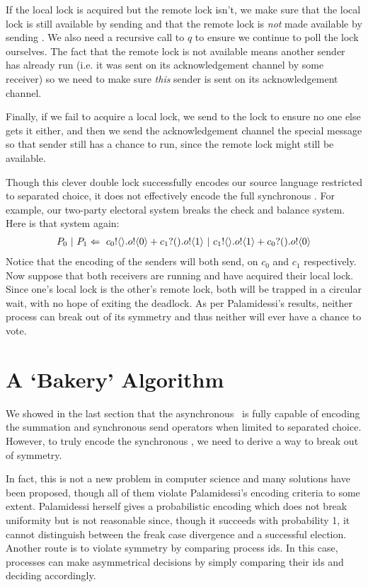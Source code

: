 If the local lock is acquired but the remote lock isn't, we make sure that the local lock is still available by sending  and that the remote lock is \emph{not} made available by sending .  
We also need a recursive call to $q$ to ensure we continue to poll the lock ourselves.  
The fact that the remote lock is not available means another sender has already run (i.e. it was sent \ptrue on its acknowledgement channel by some receiver) so we need to make sure \emph{this} sender is sent \pfalse on its acknowledgement channel.

Finally, if we fail to acquire a local lock, we send \pfalse to the lock to ensure no one else gets it either, and then we send the acknowledgement channel the special message \pretry so that sender still has a chance to run, since the remote lock might still be available.

Though this clever double lock successfully encodes our source language restricted to separated choice, it does not effectively encode the full synchronous \picalc.  
For example, our two-party electoral system breaks the check and balance system.  Here is that system again:
\begin{align}
	P_0\ |\  P_1 \Leftarrow\  {c_0}!\langle{}\rangle. {o}!\langle{0}\rangle + {c_1}?({}). {o}!\langle{1}\rangle \ |\  {c_1}!\langle{}\rangle. {o}!\langle{1}\rangle + {c_0}?({}). {o}!\langle{0}\rangle
\end{align}
Notice that the encoding of the senders will both send, on $c_0$ and $c_1$ respectively.  
Now suppose that both receivers are running and have acquired their local lock.  
Since one's local lock is the other's remote lock, both will be trapped in a circular wait, with no hope of exiting the deadlock.  
As per Palamidessi's results, neither process can break out of its symmetry and thus neither will ever have a chance to vote.

\section{A `Bakery' Algorithm}
We showed in the last section that the asynchronous \picalc\ is fully capable of encoding the summation and synchronous send operators when limited to separated choice.
However, to truly encode the synchronous \picalc, we need to derive a way to break out of symmetry.

In fact, this is not a new problem in computer science and many solutions have been proposed, though all of them violate Palamidessi's encoding criteria to some extent.
Palamidessi herself gives a probabilistic encoding \cite{palam01} which does not break uniformity  but is not reasonable  since, though it succeeds with probability 1, it cannot distinguish between the freak case divergence and a successful election.
Another route is to violate symmetry by comparing process ids.
In this case, processes can make asymmetrical decisions by simply comparing their ids and deciding accordingly.

